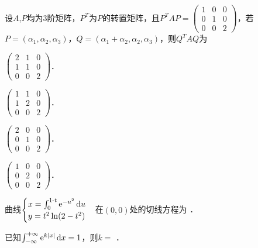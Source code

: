 \documentclass[plain,noanswer,medmath]{../../template/jnuexam}
\begin{document}




\begin{problem}
设$A$,$P$均为$3$阶矩阵，$P^T$为$P$的转置矩阵，且$P^T AP = \begin{pmatrix}
  1 & 0 & 0 \\
  0 & 1 & 0 \\
  0 & 0 & 2
\end{pmatrix}$，若$P = (\alpha_1,\alpha_2,\alpha_3)$，$Q = (\alpha_1 + \alpha_2,\alpha_2,\alpha_3)$，则$Q^T AQ$为\pickout{}
\begin{abcd}
\item $\begin{pmatrix}
  2 & 1 & 0 \\
  1 & 1 & 0 \\
  0 & 0 & 2
\end{pmatrix}$．
\item $\begin{pmatrix}
  1 & 1 & 0 \\
  1 & 2 & 0 \\
  0 & 0 & 2
\end{pmatrix}$．
\item $\begin{pmatrix}
  2 & 0 & 0 \\
  0 & 1 & 0 \\
  0 & 0 & 2
\end{pmatrix}$．
\item $\begin{pmatrix}
  1 & 0 & 0 \\
  0 & 2 & 0 \\
  0 & 0 & 2
\end{pmatrix}$．
\end{abcd}
\end{problem}




\begin{problem}
曲线$\begin{cases}
  x = \int_0^{1\text{-} t} \mathrm{e}^{- u^2} \mathop{}\!\mathrm{d} u \\
  y = t^2\ln(2 - t^2)
\end{cases}$在$(0,0)$处的切线方程为 \fillin{}．
\end{problem}


\begin{problem}
已知$\int_{-\infty}^{+\infty}\mathrm{e}^{k|x|}\mathop{}\!\mathrm{d} x = 1$，则$k=$ \fillin{}．
\end{problem}
\end{document}
